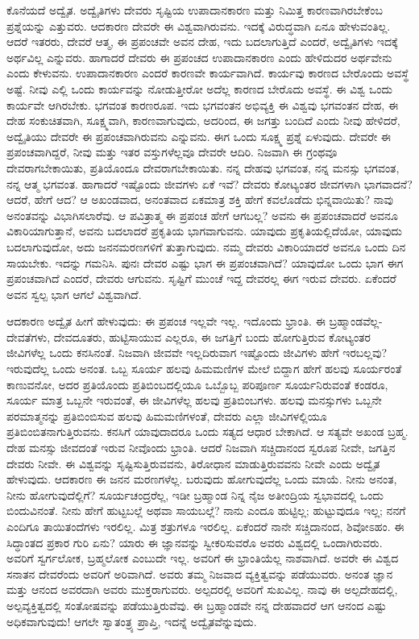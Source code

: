 ಕೊನೆಯದೆ ಅದ್ವೈತ. ಅದ್ವೈತಿಗಳು ದೇವರು ಸೃಷ್ಟಿಯ ಉಪಾದಾನಕಾರಣ ಮತ್ತು ನಿಮಿತ್ತ ಕಾರಣವಾಗಿರಬೇಕೆಂಬ ಪ್ರಶ್ನೆಯನ್ನು ಎತ್ತುವರು. ಆದಕಾರಣ ದೇವರೇ ಈ ವಿಶ್ವವಾಗಿರುವನು. ಇದಕ್ಕೆ ವಿರುದ್ಧವಾಗಿ ಏನೂ ಹೇಳುವಂತಿಲ್ಲ. ಆದರೆ ಇತರರು, ದೇವರೆ ಆತ್ಮ, ಈ ಪ್ರಪಂಚವೇ ಅವನ ದೇಹ, ಇದು ಬದಲಾಗುತ್ತಿದೆ ಎಂದರೆ, ಅದ್ವೈತಿಗಳು ಇದಕ್ಕೆ ಅರ್ಥವಿಲ್ಲ ಎನ್ನುವರು. ಹಾಗಾದರೆ ದೇವರು ಈ ಪ್ರಪಂಚದ ಉಪಾದಾನಕಾರಣ ಎಂದು ಹೇಳಿದುದರ ಅರ್ಥವೇನು ಎಂದು ಕೇಳುವನು. ಉಪಾದಾನಕಾರಣ ಎಂದರೆ ಕಾರಣವೇ ಕಾರ್ಯವಾಗಿದೆ. ಕಾರ್ಯವು ಕಾರಣದ ಬೇರೊಂದು ಅವಸ್ಥೆ ಅಷ್ಟೆ. ನೀವು ಎಲ್ಲಿ ಒಂದು ಕಾರ್ಯವನ್ನು ನೋಡುತ್ತೀರೋ ಅದೆಲ್ಲ ಕಾರಣದ ಬೇರೊದು ಅವಸ್ಥೆ. ಈ ವಿಶ್ವ ಒಂದು ಕಾರ್ಯವೇ ಆಗಿರಬೇಕು. ಭಗವಂತ ಕಾರಣರೂಪ. ಇದು ಭಗವಂತನ ಅಭಿವ್ಯಕ್ತಿ ಈ ವಿಶ್ವವು ಭಗವಂತನ ದೇಹ, ಈ ದೇಹ ಸಂಕುಚಿತವಾಗಿ, ಸೂಕ್ಷ್ಮವಾಗಿ, ಕಾರಣವಾಗುವುದು, ಅದರಿಂದ, ಈ ಜಗತ್ತು ಬಂದಿದೆ ಎಂದು ನೀವು ಹೇಳಿದರೆ, ಅದ್ವೈತಿಯು ದೇವರೇ ಈ ಪ್ರಪಂಚವಾಗಿರುವನು ಎನ್ನುವನು. ಈಗ ಒಂದು ಸೂಕ್ಷ್ಮ ಪ್ರಶ್ನೆ ಏಳುವುದು. ದೇವರೇ ಈ ಪ್ರಪಂಚವಾಗಿದ್ದರೆ, ನೀವು ಮತ್ತು ಇತರ ವಸ್ತುಗಳೆಲ್ಲವೂ ದೇವರೇ ಆದಿರಿ. ನಿಜವಾಗಿ ಈ ಗ್ರಂಥವೂ ದೇವರಾಗಬೇಕಾಯಿತು, ಪ್ರತಿಯೊಂದೂ ದೇವರಾಗಬೇಕಾಯಿತು. ನನ್ನ ದೇಹವು ಭಗವಂತ, ನನ್ನ ಮನಸ್ಸು ಭಗವಂತ, ನನ್ನ ಆತ್ಮ ಭಗವಂತ. ಹಾಗಾದರೆ ಇಷ್ಟೊಂದು ಜೀವಗಳು ಏಕೆ ಇವೆ? ದೇವರು ಕೋಟ್ಯಂತರ ಜೀವಗಳಾಗಿ ಭಾಗವಾದನೆ? ಆದರೆ, ಹೇಗೆ ಆದ? ಆ ಅಖಂಡವಾದ, ಅನಂತವಾದ ಏಕಮಾತ್ರ ಶಕ್ತಿ ಹೇಗೆ ಕವಲೊಡೆದು ಭಿನ್ನವಾಯಿತು? ನಾವು ಅನಂತವನ್ನು ವಿಭಾಗಿಸಲಾರೆವು. ಆ ಪವಿತ್ರಾತ್ಮ ಈ ಪ್ರಪಂಚ ಹೇಗೆ ಆಗಬಲ್ಲ? ಅವನು ಈ ಪ್ರಪಂಚವಾದರೆ ಅವನೂ ವಿಕಾರಿಯಾಗುತ್ತಾನೆ, ಅವನು ಬದಲಾದರೆ ಪ್ರಕೃತಿಯ ಭಾಗವಾಗುವನು. ಯಾವುದು ಪ್ರಕೃತಿಯಲ್ಲಿದೆಯೋ, ಯಾವುದು ಬದಲಾಗುವುದೋ, ಅದು ಜನನಮರಣಗಳಿಗೆ ತುತ್ತಾಗುವುದು. ನಮ್ಮ ದೇವರು ವಿಕಾರಿಯಾದರೆ ಅವನೂ ಒಂದು ದಿನ ಸಾಯಬೇಕು. ಇದನ್ನು ಗಮನಿಸಿ. ಪುನಃ ದೇವರ ಎಷ್ಟು ಭಾಗ ಈ ಪ್ರಪಂಚವಾಗಿದೆ? ಯಾವುದೋ ಒಂದು  ಭಾಗ ಈಗ ಪ್ರಪಂಚವಾಗಿದೆ ಎಂದರೆ, ದೇವರು  ಆಗುವನು. ಸೃಷ್ಟಿಗೆ ಮುಂಚೆ ಇದ್ದ ದೇವರಲ್ಲ ಈಗ ಇರುವ ದೇವರು. ಏಕೆಂದರೆ ಅವನ ಸ್ವಲ್ಪ ಭಾಗ ಆಗಲೆ ವಿಶ್ವವಾಗಿದೆ.

ಆದಕಾರಣ ಅದ್ವೈತ ಹೀಗೆ ಹೇಳುವುದು: ಈ ಪ್ರಪಂಚ ಇಲ್ಲವೇ ಇಲ್ಲ. ಇದೊಂದು ಭ್ರಾಂತಿ. ಈ ಬ್ರಹ್ಮಾಂಡವೆಲ್ಲ-ದೇವತೆಗಳು, ದೇವದೂತರು, ಹುಟ್ಟಿಸಾಯುವ ಎಲ್ಲರೂ, ಈ ಜಗತ್ತಿಗೆ ಬಂದು ಹೋಗುತ್ತಿರುವ ಕೋಟ್ಯಂತರ ಜೀವಿಗಳೆಲ್ಲ ಒಂದು ಕನಸಿನಂತೆ. ನಿಜವಾಗಿ ಜೀವವೇ ಇಲ್ಲದಿರುವಾಗ ಇಷ್ಟೊಂದು ಜೀವಿಗಳು ಹೇಗೆ ಇರಬಲ್ಲವು? ಇರುವುದೆಲ್ಲ ಒಂದು ಅನಂತ. ಒಬ್ಬ ಸೂರ್ಯ ಹಲವು ಹಿಮಮಣಿಗಳ ಮೇಲೆ ಬಿದ್ದಾಗ ಹೇಗೆ ಹಲವು ಸೂರ್ಯರಂತೆ ಕಾಣುವನೋ, ಅದರ ಪ್ರತಿಯೊಂದು ಪ್ರತಿಬಿಂಬದಲ್ಲಿಯೂ ಒಬ್ಬೊಬ್ಬ ಪರಿಪೂರ್ಣ ಸೂರ್ಯನಿರುವಂತೆ ಕಂಡರೂ, ಸೂರ್ಯ ಮಾತ್ರ ಒಬ್ಬನೇ ಇರುವಂತೆ, ಈ ಜೀವಿಗಳೆಲ್ಲ ಹಲವು ಪ್ರತಿಬಿಂಬಗಳು. ಹಲವು ಮನಸ್ಸುಗಳು ಒಬ್ಬನೇ ಪರಮಾತ್ಮನನ್ನು ಪ್ರತಿಬಿಂಬಿಸುವ ಹಲವು ಹಿಮಮಣಿಗಳಂತೆ, ದೇವರು ಎಲ್ಲಾ ಜೀವಿಗಳಲ್ಲಿಯೂ ಪ್ರತಿಬಿಂಬಿತನಾಗುತ್ತಿರುವನು. ಕನಸಿಗೆ ಯಾವುದಾದರೂ ಒಂದು ಸತ್ಯದ ಆಧಾರ ಬೇಕಾಗಿದೆ. ಆ ಸತ್ಯವೇ ಅಖಂಡ ಬ್ರಹ್ಮ. ದೇಹ ಮನಸ್ಸು ಜೀವದಂತೆ ಇರುವ ನೀವೊಂದು ಭ್ರಾಂತಿ. ಆದರೆ ನಿಜವಾಗಿ ಸಚ್ಚಿದಾನಂದ ಸ್ವರೂಪ ನೀವೇ, ಜಗತ್ತಿನ ದೇವರು ನೀವೇ. ಈ ವಿಶ್ವವನ್ನು ಸೃಷ್ಟಿಸುತ್ತಿರುವವನು, ತಿರೋಧಾನ ಮಾಡುತ್ತಿರುವವನು ನೀವೇ ಎಂದು ಅದ್ವೈತ ಹೇಳುವುದು. ಆದಕಾರಣ ಈ ಜನನ ಮರಣಗಳೆಲ್ಲ. ಬರುವುದು ಹೋಗುವುದೆಲ್ಲ ಒಂದು ಮಾಯೆ. ನೀನು ಅನಂತ, ನೀನು ಹೋಗುವುದೆಲ್ಲಿಗೆ? ಸೂರ್ಯಚಂದ್ರರೆಲ್ಲ, ಇಡೀ ಬ್ರಹ್ಮಾಂಡ ನಿನ್ನ ನೈಜ ಅತೀಂದ್ರಿಯ ಸ್ವಭಾವದಲ್ಲಿ ಒಂದು ಬಿಂದುವಿನಂತೆ. ನೀನು ಹೇಗೆ ಹುಟ್ಟಬಲ್ಲೆ ಅಥವಾ ಸಾಯಬಲ್ಲೆ? ನಾನು ಎಂದೂ ಹುಟ್ಟಿಲ್ಲ; ಹುಟ್ಟುವುದೂ ಇಲ್ಲ; ನನಗೆ ಎಂದಿಗೂ ತಾಯಿತಂದೆಗಳು ಇರಲಿಲ್ಲ. ಮಿತ್ರ ಶತ್ರುಗಳೂ ಇರಲಿಲ್ಲ. ಏಕೆಂದರೆ ನಾನೇ ಸಚ್ಚಿದಾನಂದ, ಶಿವೋಽಹಂ. ಈ ಸಿದ್ಧಾಂತದ ಪ್ರಕಾರ ಗುರಿ ಏನು? ಯಾರು ಈ ಜ್ಞಾನವನ್ನು ಸ್ವೀಕರಿಸುವರೊ ಅವರು ವಿಶ್ವದಲ್ಲಿ ಒಂದಾಗಿರುವರು. ಅವರಿಗೆ ಸ್ವರ್ಗಲೋಕ, ಬ್ರಹ್ಮಲೋಕ ಎಂಬುದೇ ಇಲ್ಲ. ಅವರಿಗೆ ಈ ಭ್ರಾಂತಿಯೆಲ್ಲ ನಾಶವಾಗಿದೆ. ಅವರೇ ಈ ವಿಶ್ವದ ಸನಾತನ ದೇವರೆಂದು ಅವರಿಗೆ ಅರಿವಾಗಿದೆ. ಅವರು ತಮ್ಮ ನಿಜವಾದ ವ್ಯಕ್ತಿತ್ವವನ್ನು ಪಡೆಯುವರು. ಅನಂತ ಜ್ಞಾನ ಮತ್ತು ಆನಂದ ಅವರದಾಗಿ ಅವರು ಮುಕ್ತರಾಗುವರು. ಅಲ್ಪದರಲ್ಲಿ ಅವರಿಗೆ ಸುಖವಿಲ್ಲ. ನಾವು ಈ ಅಲ್ಪದೇಹದಲ್ಲಿ, ಅಲ್ಪವ್ಯಕ್ತಿತ್ವದಲ್ಲಿ ಸಂತೋಷವನ್ನು ಪಡೆಯುತ್ತಿರುವೆವು. ಈ ಬ್ರಹ್ಮಾಂಡವೇ ನನ್ನ ದೇಹವಾದರೆ ಆಗ ಆನಂದ ಎಷ್ಟು ಅಧಿಕವಾಗುವುದು! ಆಗಲೇ ಸ್ವಾತಂತ್ರ್ಯ ಪ್ರಾಪ್ತಿ, ಇದನ್ನೆ ಅದ್ವೈತವೆನ್ನುವುದು.

